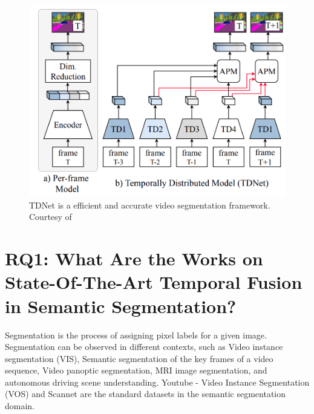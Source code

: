     \begin{figure}[h]
    	\centering
    	\includegraphics[width=12cm]{images/TDNet.png}
    	\caption{TDNet is a efficient and accurate video segmentation framework. Courtesy of \cite{78_hu2020temporally}}
    	\label{fig:TDNet}
    \end{figure}  
    
    \section{RQ1: What Are the Works on State-Of-The-Art Temporal Fusion in Semantic Segmentation?}
    
    Segmentation is the process of assigning pixel labels for a given image. Segmentation can be observed in different contexts, such as Video instance segmentation (VIS), Semantic segmentation of the key frames of a video sequence, Video panoptic segmentation, MRI image segmentation, and autonomous driving scene understanding. Youtube - Video Instance Segmentation (VOS) and Scannet are the standard datasets in the semantic segmentation domain. 
    
